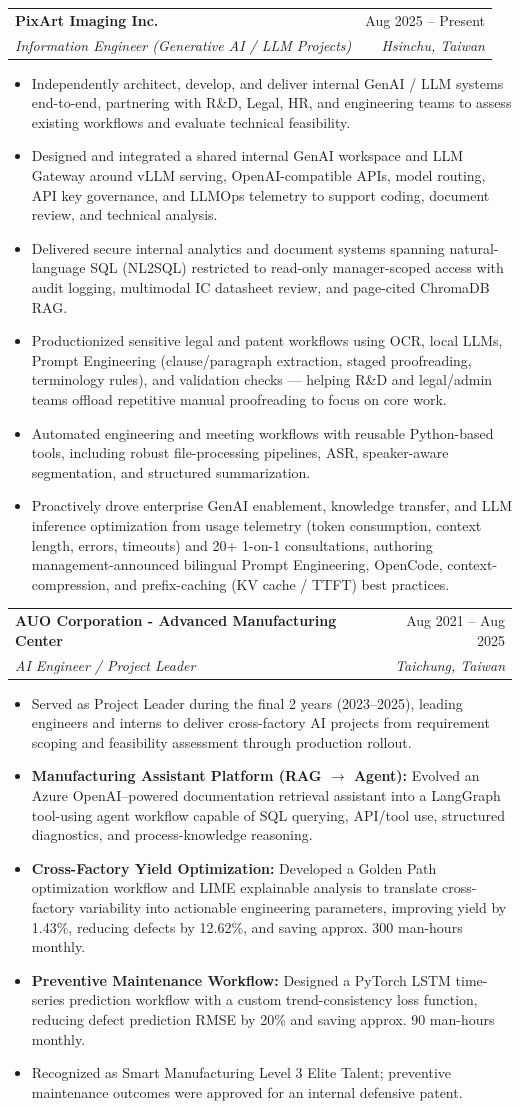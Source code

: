 \documentclass[letterpaper,11pt]{article}
\makeatletter
\newcommand{\resumeItem}[1]{
\item\small{
{#1 \vspace{-2pt}}
}
}
\newcommand{\resumeSubheading}[4]{
\vspace{-2pt}\item
\begin{tabular*}{0.97\textwidth}[t]{l@{\extracolsep{\fill}}r}
\textbf{#1} & #2 \\
\textit{\small#3} & \textit{\small #4} \\
\end{tabular*}\vspace{-7pt}
}
\newcommand{\resumeItemListStart}{\begin{itemize}}
\newcommand{\resumeItemListEnd}{\end{itemize}\vspace{-5pt}}
\makeatother
\begin{document}
\resumeSubheading
{PixArt Imaging Inc.}{Aug 2025 -- Present}
{Information Engineer (Generative AI / LLM Projects)}{Hsinchu, Taiwan}
\resumeItemListStart
\resumeItem{Independently architect, develop, and deliver internal GenAI / LLM systems end-to-end, partnering with R\&D, Legal, HR, and engineering teams to assess existing workflows and evaluate technical feasibility.}
\resumeItem{Designed and integrated a shared internal GenAI workspace and LLM Gateway around vLLM serving, OpenAI-compatible APIs, model routing, API key governance, and LLMOps telemetry to support coding, document review, and technical analysis.}
\resumeItem{Delivered secure internal analytics and document systems spanning natural-language SQL (NL2SQL) restricted to read-only manager-scoped access with audit logging, multimodal IC datasheet review, and page-cited ChromaDB RAG.}
\resumeItem{Productionized sensitive legal and patent workflows using OCR, local LLMs, Prompt Engineering (clause/paragraph extraction, staged proofreading, terminology rules), and validation checks --- helping R\&D and legal/admin teams offload repetitive manual proofreading to focus on core work.}
\resumeItem{Automated engineering and meeting workflows with reusable Python-based tools, including robust file-processing pipelines, ASR, speaker-aware segmentation, and structured summarization.}
\resumeItem{Proactively drove enterprise GenAI enablement, knowledge transfer, and LLM inference optimization from usage telemetry (token consumption, context length, errors, timeouts) and 20+ 1-on-1 consultations, authoring management-announced bilingual Prompt Engineering, OpenCode, context-compression, and prefix-caching (KV cache / TTFT) best practices.}
\resumeItemListEnd

\resumeSubheading
{AUO Corporation - Advanced Manufacturing Center}{Aug 2021 -- Aug 2025}
{AI Engineer / Project Leader}{Taichung, Taiwan}
\resumeItemListStart
\resumeItem{Served as Project Leader during the final 2 years (2023--2025), leading engineers and interns to deliver cross-factory AI projects from requirement scoping and feasibility assessment through production rollout.}
\resumeItem{\textbf{Manufacturing Assistant Platform (RAG $\rightarrow$ Agent):} Evolved an Azure OpenAI--powered documentation retrieval assistant into a LangGraph tool-using agent workflow capable of SQL querying, API/tool use, structured diagnostics, and process-knowledge reasoning.}
\resumeItem{\textbf{Cross-Factory Yield Optimization:} Developed a Golden Path optimization workflow and LIME explainable analysis to translate cross-factory variability into actionable engineering parameters, improving yield by 1.43\%, reducing defects by 12.62\%, and saving approx. 300 man-hours monthly.}
\resumeItem{\textbf{Preventive Maintenance Workflow:} Designed a PyTorch LSTM time-series prediction workflow with a custom trend-consistency loss function, reducing defect prediction RMSE by 20\% and saving approx. 90 man-hours monthly.}
\resumeItem{Recognized as Smart Manufacturing Level 3 Elite Talent; preventive maintenance outcomes were approved for an internal defensive patent.}
\resumeItemListEnd
\end{document}
